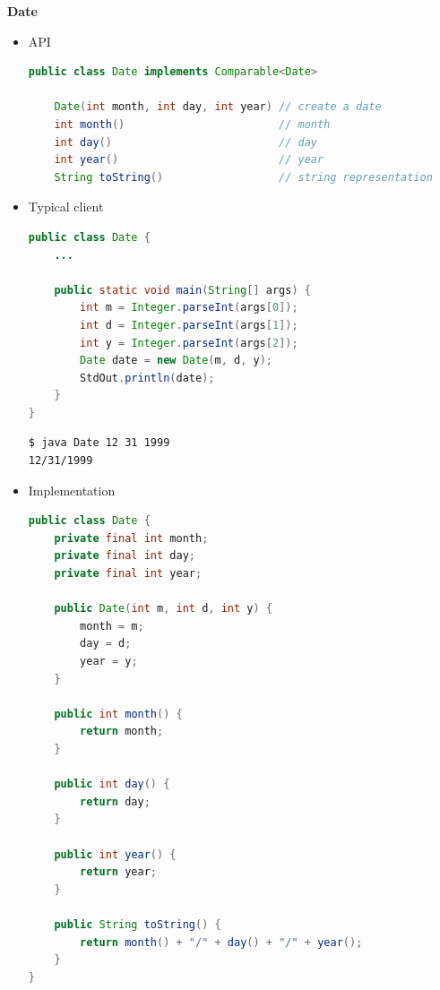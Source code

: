 \documentclass[8pt,a4paper,compress]{beamer}
\begin{document}
\begin{frame}[fragile]
\pause

\textbf{Date}
\begin{itemize}
\item API
\begin{lstlisting}[language=Java]
public class Date implements Comparable<Date>

    Date(int month, int day, int year) // create a date
    int month()                        // month
    int day()                          // day
    int year()                         // year
    String toString()                  // string representation
\end{lstlisting}

\pause
\item Typical client
\begin{lstlisting}[language=Java]
public class Date {
    ...
    
    public static void main(String[] args) {
        int m = Integer.parseInt(args[0]);
        int d = Integer.parseInt(args[1]);
        int y = Integer.parseInt(args[2]);
        Date date = new Date(m, d, y);
        StdOut.println(date);
    }
}
\end{lstlisting}

\begin{lstlisting}[language=bash]
$ java Date 12 31 1999
12/31/1999
\end{lstlisting}
\end{itemize}
\end{frame}

\begin{frame}[fragile]
\pause

\begin{itemize}
\item Implementation
\begin{lstlisting}[language=Java]
public class Date {
    private final int month;
    private final int day;
    private final int year;
    
    public Date(int m, int d, int y) { 
        month = m; 
        day = d; 
        year = y; 
    }
    
    public int month() { 
        return month; 
    }

    public int day() { 
        return day; 
    }

    public int year() { 
        return year; 
    }
    
    public String toString() { 
        return month() + "/" + day() + "/" + year();
    }
}
\end{lstlisting}
\end{itemize}
\end{frame}
\end{document}
